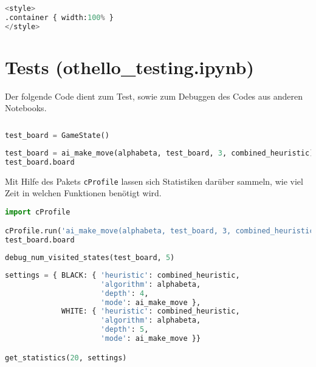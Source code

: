 \begin{lstlisting}[language=Python]
%%HTML
<style>
.container { width:100% }
</style>
\end{lstlisting}

\hypertarget{tests-othello_testing.ipynb}{%
\section{Tests
(othello\_testing.ipynb)}\label{tests-othello_testing.ipynb}}

Der folgende Code dient zum Test, sowie zum Debuggen des Codes aus
anderen Notebooks.

\begin{lstlisting}[language=Python]
%run othello_test_util.ipynb
\end{lstlisting}

\begin{lstlisting}[language=Python]
test_board = GameState()
\end{lstlisting}

\begin{lstlisting}[language=Python]
test_board = ai_make_move(alphabeta, test_board, 3, combined_heuristic)
test_board.board
\end{lstlisting}

Mit Hilfe des Pakets \passthrough{\lstinline!cProfile!} lassen sich
Statistiken darüber sammeln, wie viel Zeit in welchen Funktionen
benötigt wird.

\begin{lstlisting}[language=Python]
import cProfile

cProfile.run('ai_make_move(alphabeta, test_board, 3, combined_heuristic)')
test_board.board
\end{lstlisting}

\begin{lstlisting}[language=Python]
debug_num_visited_states(test_board, 5)
\end{lstlisting}

\begin{lstlisting}[language=Python]
settings = { BLACK: { 'heuristic': combined_heuristic,
                      'algorithm': alphabeta,
                      'depth': 4,
                      'mode': ai_make_move },
             WHITE: { 'heuristic': combined_heuristic,
                      'algorithm': alphabeta,
                      'depth': 5,
                      'mode': ai_make_move }}

get_statistics(20, settings)
\end{lstlisting}

